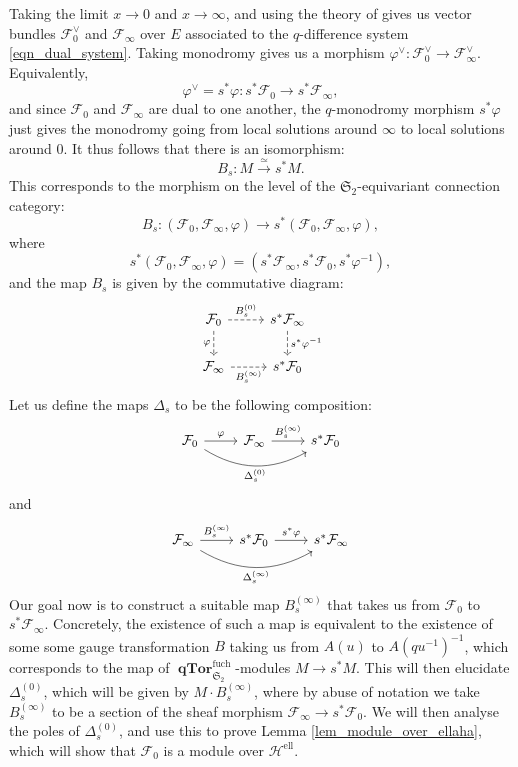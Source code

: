 \documentclass[a4paper]{report}
\theoremstyle{theorem}
\theoremstyle{definition}
\theoremstyle{remark}
\theoremstyle{proposition}
\theoremstyle{conjecture}
\theoremstyle{lemma}
\theoremstyle{corollary}
\theoremstyle{exercise}
\theoremstyle{example}
\newcommand{\mcal}{\mathcal}
\newcommand{\on}{\operatorname}
\newcommand{\qTor}{\on{\mathbf{qTor}}}
\begin{document}
  Taking the limit $x\to 0$ and $x\to\infty$, and using the theory of 
  \cite{sauloy03} gives us vector bundles $\mcal{F}_0^\vee$ and $\mcal{F}_\infty$
  over $E$ associated to the 
  $q$-difference system \eqref{eqn_dual_system}. Taking monodromy gives us a 
  morphism $\varphi^\vee : \mcal{F}_0^\vee \to \mcal{F}_\infty^\vee$.
  Equivalently, 
  $$\varphi^\vee = s^\ast\varphi : s^\ast\mcal{F}_0 \to s^\ast\mcal{F}_\infty,$$
  and since $\mcal{F}_0$ and $\mcal{F}_\infty$ are dual to one another,
  the $q$-monodromy morphism $s^\ast\varphi$ just gives the monodromy going 
  from local solutions around $\infty$ to local solutions around $0$.
  It thus follows that there is an isomorphism:
  $$B_s : M \stackrel{\simeq}{\longrightarrow} s^\ast M.$$
  This corresponds to the morphism on the level of the $\mathfrak{S}_2$-equivariant
  connection category:
  $$B_s : (\mcal{F}_0,\mcal{F}_\infty,\varphi) \longrightarrow s^\ast(\mcal{F}_0,\mcal{F}_\infty,\varphi),$$
  where $$s^\ast (\mcal{F}_0,\mcal{F}_\infty,\varphi) = (s^\ast\mcal{F}_\infty, s^\ast\mcal{F}_0, s^\ast\varphi^{-1}),$$
  and the map $B_s$ is given by the commutative diagram:
  \begin{equation}\label{eqn_Bs}
      \begin{tikzcd}
          \mathcal{F}_0 \arrow[d, "\varphi"', dashed] \arrow[r, "B_s^{(0)}", dashed] & s^\ast \mathcal{F}_\infty \arrow[d, "s^\ast \varphi^{-1}", dashed] \\
          \mathcal{F}_\infty \arrow[r, "B_s^{(\infty)}"', dashed]                    & s^\ast\mathcal{F}_0                                               
      \end{tikzcd}
  \end{equation}
  Let us define the maps $\Delta_s$ to be the following composition:
  $$\begin{tikzcd}
      \mcal{F}_0 \arrow[r, "\varphi"] \arrow[rr, "\Delta_s^{(0)}"', bend right] & \mcal{F}_\infty \arrow[r, "B_s^{(\infty)}"] & s^\ast\mcal{F}_0
  \end{tikzcd}$$
  and 
  $$\begin{tikzcd}
      \mcal{F}_\infty \arrow[r, "B_s^{(\infty)}"] \arrow[rr, "\Delta_s^{(\infty)}"', bend right] & s^\ast\mcal{F}_0 \arrow[r, "s^\ast\varphi"] & s^\ast\mcal{F}_\infty
  \end{tikzcd}$$
  Our goal now is to construct a suitable map $B_s^{(\infty)}$ that takes us from 
  $\mcal{F}_0$ to $s^\ast\mcal{F}_\infty$. Concretely, the existence of such a 
  map is equivalent to the existence of some some gauge transformation $B$ 
  taking us from $A(u)$ to $A(qu^{-1})^{-1}$, which corresponds to the map of 
  $\qTor_{\mathfrak{S}_2}^{\on{fuch}}$-modules $M \to s^\ast M$. This will then 
  elucidate $\Delta_s^{(0)}$, which will be given by $M \cdot B_s^{(\infty)}$, where by 
  abuse of notation we take $B_s^{(\infty)}$ to be a section of the sheaf morphism 
  $\mcal{F}_\infty \to s^\ast\mcal{F}_0$. We will then analyse the poles of 
  $\Delta_s^{(0)}$, and use this to prove Lemma \ref{lem_module_over_ellaha}, 
  which will show that $\mcal{F}_0$ is a module over $\mcal{H}^{\on{ell}}$.
  
\end{document}
